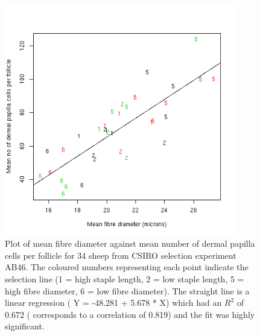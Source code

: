 %

\begin{figure}[!h]
  \centering
   \includegraphics[width=0.9\textwidth]{dpccdiam.png}
  \caption{Plot of mean fibre diameter against mean number of dermal papilla cells per follicle for 34 sheep from CSIRO selection experiment AB46. The coloured numbers representing each point indicate the selection line (1 = high staple length, 2 = low staple length, 5 = high fibre diameter, 6 = low fibre diameter). The straight line is a  linear regression ( Y = -48.281 + 5.678 * X)  which had an $R^{2}$ of 0.672 ( corresponds to a correlation of 0.819) and the fit was highly significant.}
  \label{fig:dpccdiam}
\end{figure}

%

